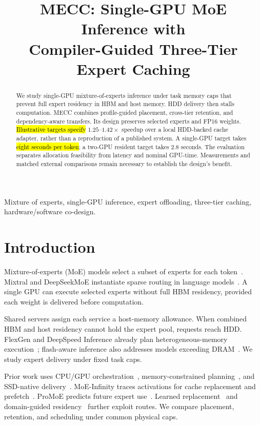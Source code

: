 \documentclass[conference,9pt,letterpaper]{IEEEtran}
\title{MECC: Single-GPU MoE Inference with\protect\\Compiler-Guided Three-Tier Expert Caching}
\author{}
\newcommand{\draftnote}[1]{{\sethlcolor{DraftYellow}\hl{#1}}}
\newcommand{\draftvalue}[1]{{\setlength{\fboxsep}{0.4pt}\colorbox{DraftYellow}{#1}}}
\begin{document}
\maketitle
\begin{abstract}
We study single-GPU mixture-of-experts inference under task memory caps that prevent full expert residency in HBM and host memory. HDD delivery then stalls computation. MECC combines profile-guided placement, cross-tier retention, and dependency-aware transfers. Its design preserves selected experts and FP16 weights. \draftnote{Illustrative targets specify} \draftvalue{$1.25$}--\draftvalue{$1.42\times$} speedup over a local HDD-backed cache adapter, rather than a reproduction of a published system. A single-GPU target takes \draftnote{eight seconds per token}; a two-GPU resident target takes \draftvalue{2.8} seconds. The evaluation separates allocation feasibility from latency and nominal GPU-time. Measurements and matched external comparisons remain necessary to establish the design's benefit.
\end{abstract}
\begin{IEEEkeywords}
Mixture of experts, single-GPU inference, expert offloading, three-tier caching, hardware/software co-design.
\end{IEEEkeywords}

\section{Introduction}
Mixture-of-experts (MoE) models select a subset of experts for each token~\cite{shazeer,switch,gshard}. Mixtral and DeepSeekMoE instantiate sparse routing in language models~\cite{mixtral,deepseekmoe}. A single GPU can execute selected experts without full HBM residency, provided each weight is delivered before computation.

Shared servers assign each service a host-memory allowance. When combined HBM and host residency cannot hold the expert pool, requests reach HDD. FlexGen and DeepSpeed Inference already plan heterogeneous-memory execution~\cite{flexgen,dsinference}; flash-aware inference also addresses models exceeding DRAM~\cite{llmflash}. We study expert delivery under fixed task caps.

Prior work uses CPU/GPU orchestration~\cite{fiddler}, memory-constrained planning~\cite{lightning}, and SSD-native delivery~\cite{ssdllama}. MoE-Infinity traces activations for cache replacement and prefetch~\cite{moeinfinity}. ProMoE predicts future expert use~\cite{promoe}. Learned replacement~\cite{flashmoe} and domain-guided residency~\cite{core} further exploit routes. We compare placement, retention, and scheduling under common physical caps.
\end{document}
